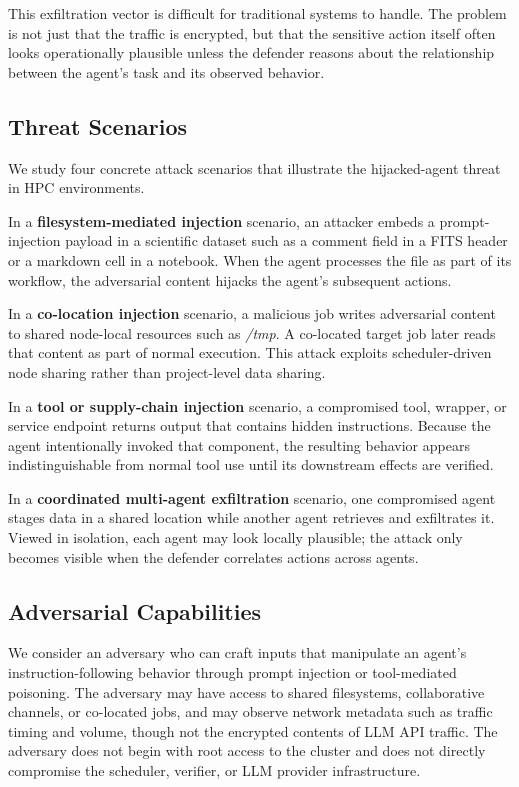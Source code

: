 This exfiltration vector is difficult for traditional \dlp{} systems to handle. The problem is not just that the traffic is encrypted, but that the sensitive action itself often looks operationally plausible unless the defender reasons about the relationship between the agent's task and its observed behavior.

\subsection{Threat Scenarios}

We study four concrete attack scenarios that illustrate the hijacked-agent threat in HPC environments.

In a \textbf{filesystem-mediated injection} scenario, an attacker embeds a prompt-injection payload in a scientific dataset such as a comment field in a FITS header or a markdown cell in a notebook. When the agent processes the file as part of its workflow, the adversarial content hijacks the agent's subsequent actions.

In a \textbf{co-location injection} scenario, a malicious job writes adversarial content to shared node-local resources such as \textit{/tmp}. A co-located target job later reads that content as part of normal execution. This attack exploits scheduler-driven node sharing rather than project-level data sharing.

In a \textbf{tool or supply-chain injection} scenario, a compromised tool, wrapper, or service endpoint returns output that contains hidden instructions. Because the agent intentionally invoked that component, the resulting behavior appears indistinguishable from normal tool use until its downstream effects are verified.

In a \textbf{coordinated multi-agent exfiltration} scenario, one compromised agent stages data in a shared location while another agent retrieves and exfiltrates it. Viewed in isolation, each agent may look locally plausible; the attack only becomes visible when the defender correlates actions across agents.

\subsection{Adversarial Capabilities}

We consider an adversary who can craft inputs that manipulate an agent's instruction-following behavior through prompt injection or tool-mediated poisoning. The adversary may have access to shared filesystems, collaborative channels, or co-located jobs, and may observe network metadata such as traffic timing and volume, though not the encrypted contents of LLM API traffic. The adversary does not begin with root access to the cluster and does not directly compromise the scheduler, verifier, or LLM provider infrastructure.

